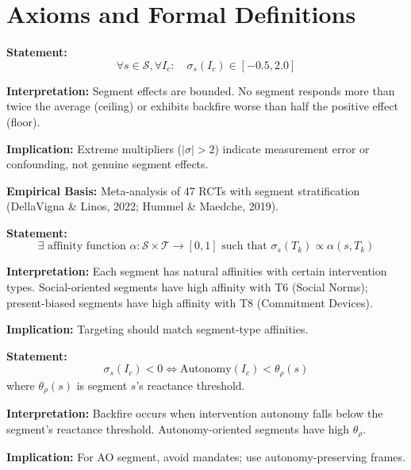 \section{Axioms and Formal Definitions}
\label{sec:qq-axioms}

\begin{tcolorbox}[colback=gray!5!white, colframe=gray!75!black,
    title=Axiom UNMAPPED_QQ-1: Multiplier Bounds]
\textbf{Statement:}
\begin{equation}
\forall s \in \mathcal{S}, \forall I_c: \quad \sigma_s(I_c) \in [-0.5, 2.0]
\end{equation}

\textbf{Interpretation:} Segment effects are bounded. No segment responds more than
twice the average (ceiling) or exhibits backfire worse than half the positive effect (floor).

\textbf{Implication:} Extreme multipliers ($|\sigma| > 2$) indicate measurement error
or confounding, not genuine segment effects.

\textbf{Empirical Basis:} Meta-analysis of 47 RCTs with segment stratification
(DellaVigna \& Linos, 2022; Hummel \& Maedche, 2019).
\end{tcolorbox}

\begin{tcolorbox}[colback=gray!5!white, colframe=gray!75!black,
    title=Axiom UNMAPPED_QQ-2: Segment-Type Affinity]
\textbf{Statement:}
\begin{equation}
\exists \text{ affinity function } \alpha: \mathcal{S} \times \mathcal{T} \rightarrow [0, 1]
\text{ such that } \sigma_s(T_k) \propto \alpha(s, T_k)
\end{equation}

\textbf{Interpretation:} Each segment has natural affinities with certain intervention
types. Social-oriented segments have high affinity with T6 (Social Norms);
present-biased segments have high affinity with T8 (Commitment Devices).

\textbf{Implication:} Targeting should match segment-type affinities.
\end{tcolorbox}

\begin{tcolorbox}[colback=gray!5!white, colframe=gray!75!black,
    title=Axiom UNMAPPED_QQ-3: Reactance Threshold]
\textbf{Statement:}
\begin{equation}
\sigma_s(I_c) < 0 \iff \text{Autonomy}(I_c) < \theta_{\rho}(s)
\end{equation}
where $\theta_{\rho}(s)$ is segment $s$'s reactance threshold.

\textbf{Interpretation:} Backfire occurs when intervention autonomy falls below
the segment's reactance threshold. Autonomy-oriented segments have high $\theta_{\rho}$.

\textbf{Implication:} For AO segment, avoid mandates; use autonomy-preserving frames.
\end{tcolorbox}


